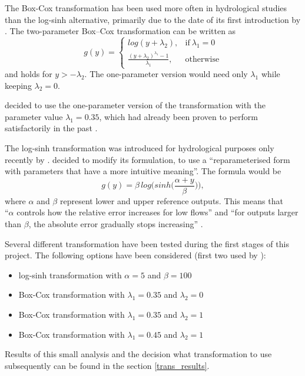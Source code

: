 \documentclass{ctuthesis}\usepackage[]{graphicx}\usepackage[]{color}
\begin{document}
The Box-Cox transformation has been used more often in hydrological studies \\ \citep{giudice2013improving} than the log-sinh alternative, primarily due to the date of its first introduction by \cite{box1964analysis}. The two-parameter Box–Cox transformation can be written as
\begin{equation}
 g(y)=
    \begin{cases}
      log(y+\lambda_2) , & \text{if}\ \lambda_1=0 \\
      \frac{(y+\lambda_2)^{\lambda_1}-1}{\lambda_1} , & \text{otherwise}
    \end{cases}
\end{equation}
and holds for $y > -\lambda_2$. The one-parameter version would need only  $\lambda_1$  while keeping $\lambda_2 = 0$.

\cite{giudice2013improving} decided to use the one-parameter version of the transformation with the parameter value $\lambda_1=0.35$, which had already been proven to perform satisfactorily in the past \citep[e.g.][]{honti2013integrated, wang2012log}.


The log-sinh transformation was introduced for hydrological purposes only recently by \cite{wang2012log}. \cite{giudice2013improving}  decided to modify its formulation, to use a \enquote{reparameterised form with parameters that have a more intuitive meaning}. The formula would be
\begin{equation}
g(y)= \beta \, log \Big(sinh \big( \frac{\alpha+y}{\beta} \big) \Big),
\end{equation}
where $\alpha$ and $\beta$ represent lower and upper reference outputs. This means that \\ \enquote{$\alpha$ controls how the relative error increases for low flows} and \enquote{for outputs larger than $\beta$, the absolute error gradually stops increasing} \citep{giudice2013improving}.

Several different transformation have been tested during the first stages of this project. The following options have been considered (first two used by \cite{giudice2013improving}): 
\begin{itemize}
	\item   log-sinh transformation with $\alpha=5$ and  $\beta=100$  
	\item   Box-Cox transformation with $\lambda_1 = 0.35$ and $\lambda_2 = 0$
	\item   Box-Cox transformation with $\lambda_1 = 0.35$ and $\lambda_2 = 1$
	\item   Box-Cox transformation with $\lambda_1 = 0.45$ and $\lambda_2 = 1$	
\end{itemize}
Results of this small analysis and the decision what transformation to use subsequently can be found in the section \ref{trans_results}.
\end{document}
